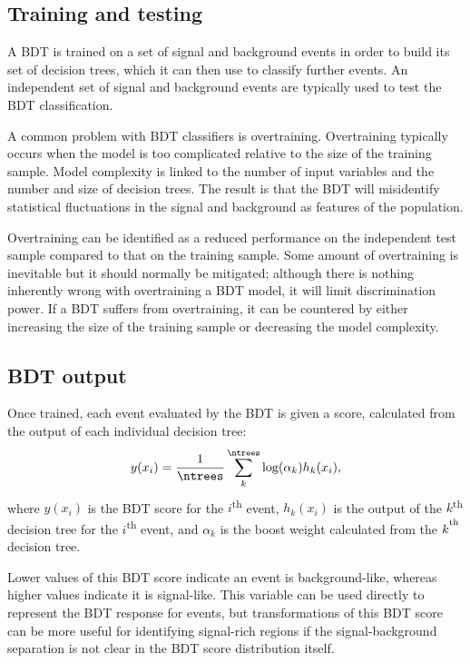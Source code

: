 \subsection{Training and testing}

A \ac{BDT} is trained on a set of signal and background events in order to build
its set of decision trees, which it can then use to classify further events.
An independent set of signal and background events are typically used to test
the \ac{BDT} classification.

A common problem with \ac{BDT} classifiers is overtraining. Overtraining
typically occurs when the model is too complicated relative to the size of the
training sample. Model complexity is linked to the number of input variables and
the number and size of decision trees.
The result is that the \ac{BDT} will misidentify statistical fluctuations
in the signal and background as features of the population.

Overtraining can be identified as a reduced performance on the independent
test sample compared to that on the training sample. Some amount of overtraining is
inevitable but it should normally be mitigated; although there is nothing
inherently wrong with overtraining a \ac{BDT} model, it will limit
discrimination power. If a \ac{BDT} suffers from overtraining, it can be
countered by either increasing the size of the training sample or decreasing the
model complexity.

\subsection{BDT output}
\label{sec:methods-bdt-output}

Once trained, each event evaluated by the \ac{BDT} is given a score,
calculated from the output of each individual decision tree:
\begin{equation*}
  y(x_i) = \frac1{\ntrees} \sum_k^{\ntrees} \log(\alpha_k)h_k(x_i),
\end{equation*}
where $y(x_i)$ is the \ac{BDT} score for the $i$\textsuperscript{th} event,
$h_k(x_i)$ is the output of the $k$\textsuperscript{th} decision tree for the
$i$\textsuperscript{th} event, and $\alpha_k$ is the boost weight calculated
from the $k^\textsuperscript{th}$ decision tree.

Lower values of this \ac{BDT} score indicate an event is background-like,
whereas higher values indicate it is signal-like. This variable can be used
directly to represent the \ac{BDT} response for events, but
transformations of this \ac{BDT} score can be more useful for identifying
signal-rich regions if the signal-background separation is not clear in the
\ac{BDT} score distribution itself.

